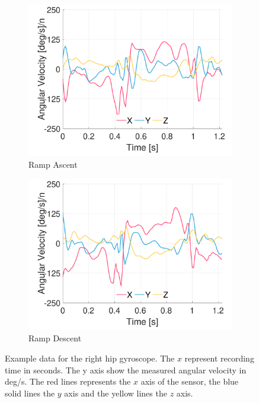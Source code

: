 \begin{figure}[p]
    \begin{subfigure}[b]{0.49\textwidth}
         \centering
         \includegraphics[width=\textwidth]{content/3-Methods/example-data/ch3_example_data_subject_01_r_hip_gyro_activity_ramp_up.pdf}
         \caption{Ramp Ascent}
    \end{subfigure}
    \begin{subfigure}[b]{0.49\textwidth}
         \centering
         \includegraphics[width=\textwidth]{content/3-Methods/example-data/ch3_example_data_subject_01_r_hip_gyro_activity_ramp_down.pdf}
         \caption{Ramp Descent}
    \end{subfigure}
    \caption[Example right hip gyroscope data]{Example data for the right hip gyroscope. The $x$ represent recording time in seconds. The y axis show the measured angular velocity in deg/s. The red lines represents the $x$ axis of the sensor, the blue solid lines the $y$ axis and the yellow lines the $z$ axis.}
    \label{fig:example-right-hip-gyro-sensor-data}
\end{figure}

